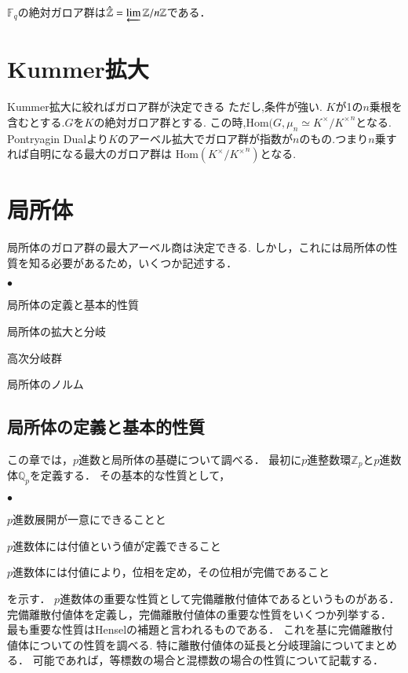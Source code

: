 \documentclass{ujarticle}
\renewenvironment{itemize}%
{%
   \begin{list}{\parbox{1zw}{$\bullet$}}%
   {%
      \setlength{\topsep}{0zh}
      \setlength{\itemindent}{0zw}
      \setlength{\leftmargin}{2zw}%
      \setlength{\rightmargin}{0zw}%
      \setlength{\labelsep}{1zw}%
      \setlength{\labelwidth}{3zw}%
      \setlength{\itemsep}{0em}%
      \setlength{\parsep}{0em}%
      \setlength{\listparindent}{0zw}%
   }
}{%
   \end{list}%
}
\begin{document}
\begin{cor}
 $\mathbb{F}_q$の絶対ガロア群は$\hat{\mathbb{Z}}=\varprojlim \mathbb{Z}/n \mathbb{Z}$である．
\end{cor}

\section{Kummer拡大}
\label{sec:Kummer拡大}
Kummer拡大に絞ればガロア群が決定できる ただし,条件が強い.
$K$が1の$n$乗根を含むとする.$G$を$K$の絶対ガロア群とする.
この時,$\mathrm{Hom}(G,\mu_n \simeq K^{\times}/{K^{\times}}^n$となる.
Pontryagin Dualより$K$のアーベル拡大でガロア群が指数が$n$のもの.つまり$n$乗すれば自明になる最大のガロア群は
$\mathrm{Hom}(K^{\times}/{K^{\times}}^n)$となる.



\section{局所体}
\label{sec:局所体}
局所体のガロア群の最大アーベル商は決定できる.
しかし，これには局所体の性質を知る必要があるため，いくつか記述する．

\begin{itemize}
  \item 局所体の定義と基本的性質
  \item 局所体の拡大と分岐
  \item 高次分岐群
  \item 局所体のノルム
\end{itemize}
\subsection{局所体の定義と基本的性質}
\label{sub:局所体の定義と基本的性質}
この章では，$p$進数と局所体の基礎について調べる．
最初に$p$進整数環$\mathbb{Z}_p$と$p$進数体$\mathbb{Q}_p$を定義する．
その基本的な性質として，
\begin{itemize}
  \item $p$進数展開が一意にできることと
  \item $p$進数体には付値という値が定義できること
  \item $p$進数体には付値により，位相を定め，その位相が完備であること
\end{itemize}
を示す．
$p$進数体の重要な性質として完備離散付値体であるというものがある．
完備離散付値体を定義し，完備離散付値体の重要な性質をいくつか列挙する．
最も重要な性質はHenselの補題と言われるものである．
これを基に完備離散付値体についての性質を調べる.
特に離散付値体の延長と分岐理論についてまとめる．
可能であれば，等標数の場合と混標数の場合の性質について記載する．
\end{document}
